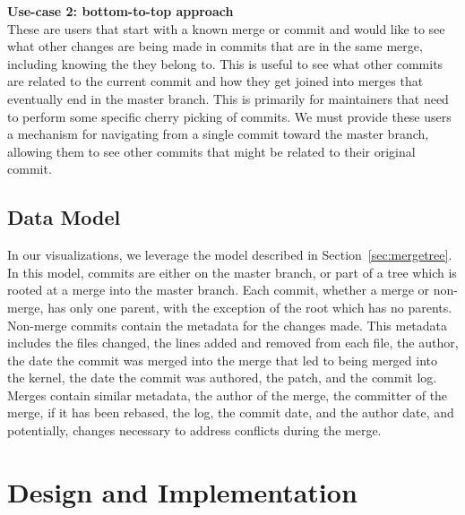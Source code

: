 \documentclass[draft]{IEEEtran}
\begin{document}
\noindent \textbf{Use-case 2: bottom-to-top approach}
\label{sec:usecase2}\\ These are users that start with a known merge or
commit and would like to see what other changes are being made in
commits that are in the same merge, including knowing the \mt
they belong to. This is useful to see what other commits are related to
the current commit and how they get joined into merges that eventually
end in the master branch. This is primarily for maintainers that need to
perform some specific cherry picking of commits. We must provide these
users a mechanism for navigating from a single commit toward the master
branch, allowing them to see other commits that might be related to
their original commit.

\subsection{Data Model}

In our visualizations, we leverage the \mt model described in
Section~\ref{sec:mergetree}. In this model, commits are either on the
master branch, or part of a tree which is rooted at a merge into the
master branch. Each commit, whether a merge or non-merge, has only one
parent, with the exception of the root which has no parents. Non-merge
commits contain the metadata for the changes made. This metadata
includes the files changed, the lines added and removed from each file,
the author, the date the commit was merged into the merge that led to
being merged into the kernel, the date the commit was authored, the
patch, and the commit log. Merges contain similar metadata, the author
of the merge, the committer of the merge, if it has been rebased, the
log, the commit date, and the author date, and potentially, changes
necessary to address conflicts during the merge.

\section{Design and Implementation}











\balance




\end{document}
